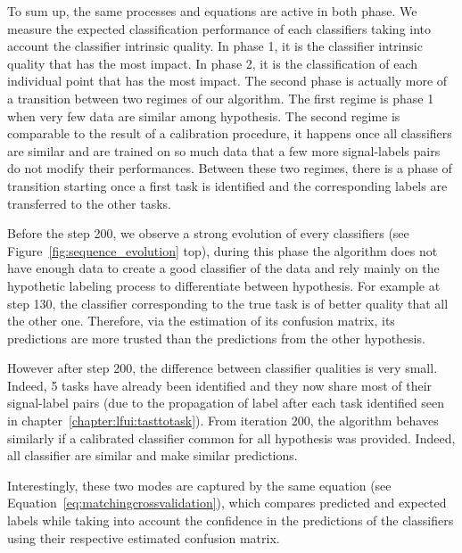 
To sum up, the same processes and equations are active in both phase. We measure the expected classification performance of each classifiers taking into account the classifier intrinsic quality. In phase 1, it is the classifier intrinsic quality that has the most impact. In phase 2, it is the classification of each individual point that has the most impact. The second phase is actually more of a transition between two regimes of our algorithm. The first regime is phase 1 when very few data are similar among hypothesis. The second regime is comparable to the result of a calibration procedure, it happens once all classifiers are similar and are trained on so much data that a few more signal-labels pairs do not modify their performances. Between these two regimes, there is a phase of transition starting once a first task is identified and the corresponding labels are  transferred to the other tasks.

Before the step 200, we observe a strong evolution of every classifiers (see Figure~\ref{fig:sequence_evolution} top), during this phase the algorithm does not have enough data to create a good classifier of the data and rely mainly on the hypothetic labeling process to differentiate between hypothesis. For example at step 130, the classifier corresponding to the true task is of better quality that all the other one. Therefore, via the estimation of its confusion matrix, its predictions are more trusted than the predictions from the other hypothesis.

However after step 200, the difference between classifier qualities is very small. Indeed, 5 tasks have already been identified and they now share most of their signal-label pairs (due to the propagation of label after each task identified seen in chapter~\ref{chapter:lfui:tasttotask}). From iteration 200, the algorithm behaves similarly if a calibrated classifier common for all hypothesis was provided. Indeed,  all classifier are similar and make similar predictions. 

Interestingly, these two modes are captured by the same equation (see Equation~\ref{eq:matchingcrossvalidation}), which compares predicted and expected labels while taking into account the confidence in the predictions of the classifiers using their respective estimated confusion matrix.

